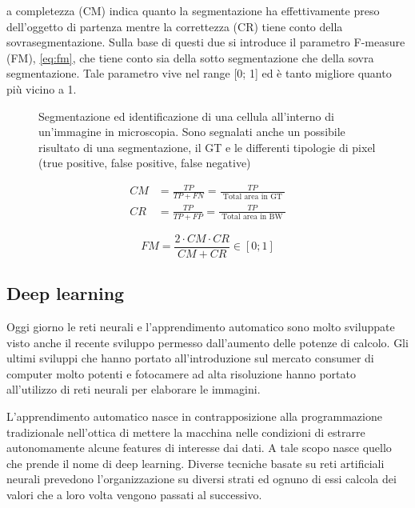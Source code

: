 \documentclass{ieeeojies}
\begin{document}
a completezza (CM) indica quanto la segmentazione ha effettivamente preso dell’oggetto di partenza mentre la correttezza (CR) tiene conto della sovrasegmentazione. Sulla base di questi due si introduce il parametro F-measure (FM), \cref{eq:fm}, che tiene conto sia della sotto segmentazione che della sovra segmentazione. Tale parametro vive nel range [0; 1] ed è tanto migliore quanto più vicino a 1.

\begin{figure}
	\tiny{\def\svgwidth{\linewidth}
		}
	\caption{Segmentazione ed identificazione di una cellula all'interno di un'immagine in microscopia. Sono segnalati anche un possibile risultato di una segmentazione, il GT e le differenti tipologie di pixel (true positive, false positive, false negative)}
\end{figure}

\begin{equation}
\begin{aligned}
	C M &=\frac{T P}{T P+F N}=\frac{T P}{\text { Total area in GT }} \\
	C R &=\frac{T P}{T P+F P}=\frac{T P}{\text { Total area in BW }} 
\end{aligned}
\label{eq:metrics}
\end{equation}

\begin{equation}
F M=\frac{2 \cdot C M \cdot C R}{C M+C R} \in[0 ; 1]
\label{eq:fm}
\end{equation}



\subsection{Deep learning}

Oggi giorno le reti neurali e l’apprendimento automatico sono molto sviluppate visto anche il recente sviluppo permesso dall’aumento delle potenze di calcolo. Gli ultimi sviluppi che hanno portato all’introduzione sul mercato consumer di computer molto potenti e fotocamere ad alta risoluzione hanno portato all’utilizzo di reti neurali per elaborare le immagini.

L’apprendimento automatico nasce in contrapposizione alla programmazione tradizionale nell’ottica di mettere la macchina nelle condizioni di estrarre autonomamente alcune features di interesse dai dati. A tale scopo nasce quello che prende il nome di deep learning. Diverse tecniche basate su reti artificiali neurali prevedono l’organizzazione su diversi strati ed ognuno di essi calcola dei valori che a loro volta vengono passati al successivo.
\end{document}
